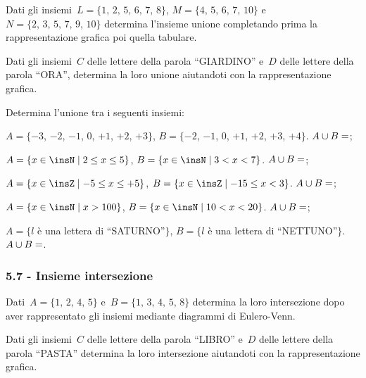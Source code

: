 \begin{esercizio}
 \label{ese:5.53}
 Dati gli insiemi~$L=\{\text{1, 2, 5, 6, 7, 8}\}$, $M=\{\text{4, 5, 6, 7, 10}\}$ e~$N=\{\text{2, 3, 5, 7, 9, 10}\}$
determina l'insieme unione completando prima la rappresentazione
grafica poi quella tabulare.
\begin{center}
 
\end{center}
\end{esercizio}

\begin{esercizio}
 \label{ese:5.54}
Dati gli insiemi~$C$ delle lettere della parola ``GIARDINO'' e~$D$ delle lettere della
parola ``ORA'', determina la loro unione aiutandoti con la rappresentazione grafica.
 \end{esercizio}

\begin{esercizio}
\label{ese:5.55}
Determina l'unione tra i seguenti insiemi:

\begin{enumeratea}
 \item $A=\{-3$, $-2$, $-1$, $0$, $+1$, $+2$, $+3\}$, $B=\{-2$, $-1$, $0$, $+1$, $+2$, $+3$, $+4\}$. $A\cup B=\dotfill$;
 \item $A=\{x\in\insN\mid 2\le x\le 5\}$, $B=\{x\in\insN\mid 3<x<7\}$. $A\cup B=\dotfill$;
 \item $A=\{x\in\insZ\mid -5\le x\le +5\}$, $B=\{x\in\insZ\mid -15\le x<3\}$. $A\cup B=\dotfill$;
 \item $A=\{x\in\insN\mid x>100\}$, $B=\{x\in\insN\mid 10<x<20\}$. $A\cup B=\dotfill$;
 \item $A=\{l$ è una lettera di ``SATURNO''$\}$, $B=\{l$ è una lettera di ``NETTUNO''$\}$. $A\cup B=\dotfill$.
\end{enumeratea}
\end{esercizio}

\subsubsection*{5.7 - Insieme intersezione}
 \begin{esercizio}
 \label{ese:5.56}
Dati~$A=\{\text{1, 2, 4, 5}\}$ e~$B=\{\text{1, 3, 4, 5, 8}\}$ determina la loro
intersezione dopo aver rappresentato gli insiemi mediante diagrammi di
Eulero-Venn.
\end{esercizio}

\begin{esercizio}[\Ast]
 \label{ese:5.57}
Dati gli insiemi~$C$ delle lettere della parola ``LIBRO'' e~$D$ delle lettere della
parola ``PASTA'' determina la loro intersezione aiutandoti con la rappresentazione grafica.
\end{esercizio}

